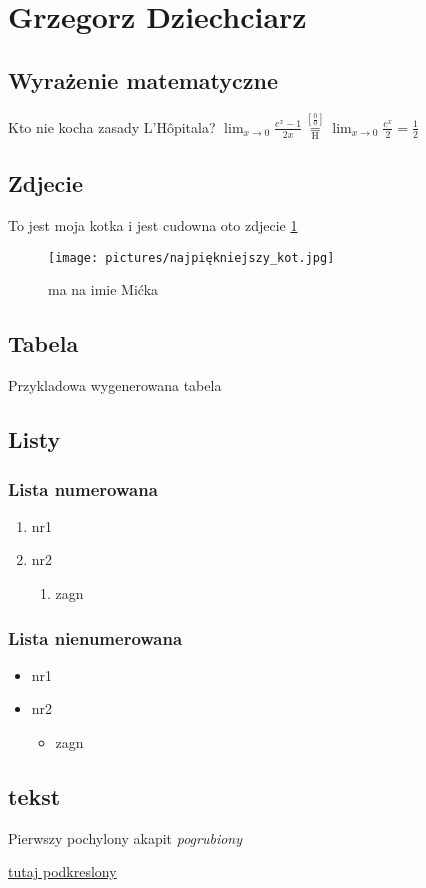 \section{Grzegorz Dziechciarz}

\subsection{Wyrażenie matematyczne}
Kto nie kocha zasady  L'Hôpitala?
$
 \lim_{x\to 0}{\frac{e^x-1}{2x}}
 \overset{\left[\frac{0}{0}\right]}{\underset{\mathrm{H}}{=}}
 \lim_{x\to 0}{\frac{e^x}{2}}={\frac{1}{2}}
 $
\subsection{Zdjecie}
    To jest moja kotka i jest cudowna oto zdjecie \ref{fig:najpiękniejszy_kot}
    \begin{figure}[h]
        \centering
        \texttt{[image: pictures/najpiękniejszy\_kot.jpg]}
        \caption{ma na imie Mićka}
        \label{fig:najpiękniejszy_kot}
    \end{figure}
    \newpage
\subsection{Tabela}
    Przykladowa wygenerowana tabela
    
\subsection{Listy}
    \subsubsection{Lista numerowana}
        \begin{enumerate}
            \item nr1
            \item nr2
            \begin{enumerate}
                \item zagn 
            \end{enumerate}
        \end{enumerate}
\subsubsection{Lista nienumerowana}
    \begin{itemize}
        \item nr1
        \item nr2
        \begin{itemize}
            \item zagn
        \end{itemize}
    \end{itemize}    
    
\subsection{tekst}
    Pierwszy pochylony akapit \textit{pogrubiony} 
    
    \underline{tutaj podkreslony}